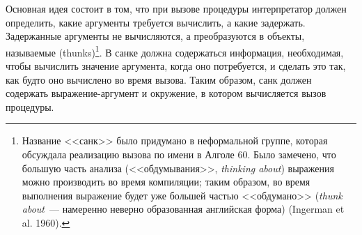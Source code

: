 Основная идея состоит в том, что при вызове процедуры
интерпретатор должен определить, какие аргументы требуется вычислить,
а какие задержать.  Задержанные аргументы не вычисляются, а
преобразуются в объекты, называемые 
(thunks)\footnote{Название <<санк>> было 
придумано в
неформальной группе, которая обсуждала реализацию вызова по имени в
Алголе 60.
Было замечено, что большую часть анализа
(<<обдумывания>>, {\em thinking about}) выражения можно производить
во время компиляции; таким образом, во время выполнения выражение
будет уже большей частью <<обдумано>> ({\em thunk about}~---
намеренно неверно образованная английская форма)
(Ingerman et al. 1960).}.
В санке должна содержаться информация, необходимая, чтобы вычислить
значение аргумента, когда оно потребуется, и сделать это так, как будто оно
вычислено во время вызова.  Таким образом, санк должен содержать
выражение-аргумент и окружение, в котором вычисляется вызов процедуры.

